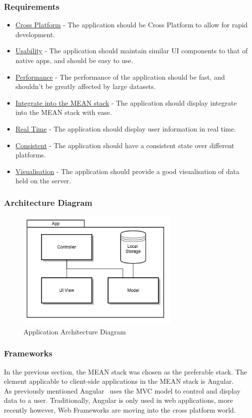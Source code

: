 \documentclass[draft,preprint,12pt,3p]{elsarticle}
\begin{document}
\subsubsection{Requirements}
\begin{itemize}
\item \underline{Cross Platform} - The application should be Cross Platform to allow for rapid development.
\item \underline{Usability} - The application should maintain similar UI components to that of native apps, and should be easy to use.
\item \underline{Performance} - The performance of the application should be fast, and shouldn't be greatly affected by large datasets.
\item \underline{Integrate into the MEAN stack} - The application should display integrate into the MEAN stack with ease.
\item \underline{Real Time} - The application should display user information in real time.
\item \underline{Consistent} - The application should have a consistent state over different platforms.
\item \underline{Visualisation} - The application should provide a good visualisation of data held on the server.
\end{itemize}
\subsubsection{Architecture Diagram}
\begin{figure}[H]
    \centering
    \includegraphics[width=8cm]{diagrams/app}
    \caption {Application Architecture Diagram}
\end{figure}
\subsubsection{Frameworks}
In the previous section, the MEAN stack was chosen as the preferable stack. The element applicable to client-side applications in the MEAN stack is Angular.\\
As previously mentioned Angular~\cite{angular} uses the MVC model to control and display data to a user. Traditionally, Angular is only used in web applications, more recently however, Web Frameworks are moving into the cross platform world.
\end{document}
